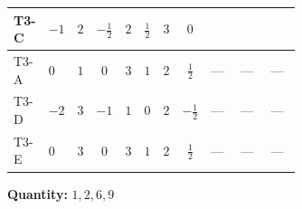 \documentclass[8pt]{article}
\begin{document}
\begin{landscape}
\begin{longtable}{@{}llcccccc >{\raggedright\arraybackslash}p{0.21\linewidth} >{\raggedright\arraybackslash}p{0.21\linewidth} >{\raggedright\arraybackslash}p{0.21\linewidth}@{}}
T3-C & $-1$ & $2$ & $-\frac{1}{2}$ & $2$ & $\frac{1}{2}$ & $3$ & $0$ & \scriptsize\adjustbox{max width=\linewidth}{$\begin{gathered} \frac{i lambda12Inv2 \overline{y_{1}} \overline{y_{2}}}{6 MF}\end{gathered}$} & \scriptsize\adjustbox{max width=\linewidth}{$\begin{gathered} \frac{\sqrt{3} i g_{2}^{2} \overline{y_{1}} \overline{y_{2}}}{8 MF}\end{gathered}$} & \scriptsize\adjustbox{max width=\linewidth}{$\begin{gathered} - \frac{\sqrt{3} i ye \overline{y_{1}} \overline{y_{2}} \overline{ye}}{24 MF}\end{gathered}$} \\
\midrule
T3-A & $0$ & $1$ & $0$ & $3$ & $1$ & $2$ & $\frac{1}{2}$ & --- & --- & --- \\
\midrule
T3-D & $-2$ & $3$ & $-1$ & $1$ & $0$ & $2$ & $-\frac{1}{2}$ & --- & --- & --- \\
\midrule
T3-E & $0$ & $3$ & $0$ & $3$ & $1$ & $2$ & $\frac{1}{2}$ & --- & --- & --- \\
\midrule
\bottomrule
\end{longtable}
\clearpage
\noindent\textbf{Quantity: }$\mathrm{1,2,6,9}$\par\smallskip

\end{landscape}
\end{document}
